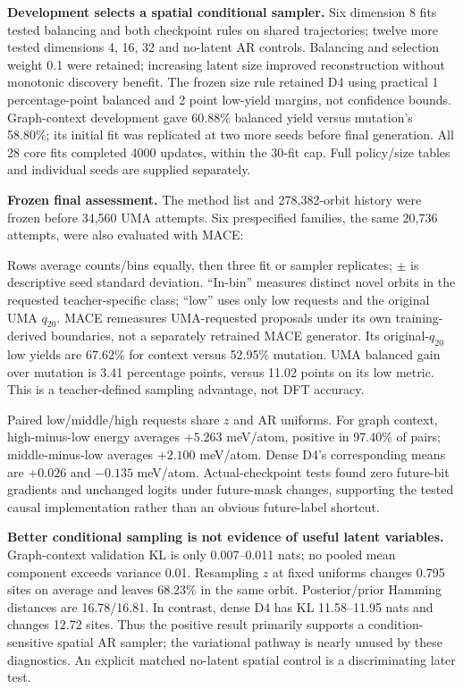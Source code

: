 \textbf{Development selects a spatial conditional sampler.}
Six dimension 8 fits tested balancing and both checkpoint rules on shared
trajectories; twelve more tested dimensions 4, 16, 32 and no-latent AR controls.
Balancing and selection weight 0.1 were retained; increasing latent size improved
reconstruction without monotonic discovery benefit. The frozen size rule retained
D4 using practical 1 percentage-point balanced and 2 point low-yield margins,
not confidence bounds. Graph-context development gave 60.88\% balanced yield
versus mutation's 58.80\%; its initial fit was replicated at two more seeds before
final generation. All 28 core fits completed 4000 updates, within the 30-fit cap.
Full policy/size tables and individual seeds are supplied separately.

\textbf{Frozen final assessment.} The method list and 278,382-orbit history were
frozen before 34,560 UMA attempts. Six prespecified families, the same 20,736
attempts, were also evaluated with MACE:



Rows average counts/bins equally, then three fit or sampler replicates;
$\pm$ is descriptive seed standard deviation. ``In-bin'' measures distinct novel
orbits in the requested teacher-specific class; ``low'' uses only low requests
and the original UMA $q_{20}$. MACE remeasures UMA-requested proposals under its own
training-derived boundaries, not a separately retrained MACE generator.
Its original-$q_{20}$ low yields are 67.62\% for context versus 52.95\% mutation.
UMA balanced gain over mutation is 3.41 percentage points, versus 11.02 points
on its low metric. This is a teacher-defined sampling advantage, not DFT accuracy.

Paired low/middle/high requests share $z$ and AR uniforms. For graph context,
high-minus-low energy averages $+5.263$ meV/atom, positive in 97.40\% of pairs;
middle-minus-low averages $+2.100$ meV/atom. Dense D4's corresponding means are
$+0.026$ and $-0.135$ meV/atom. Actual-checkpoint tests found zero future-bit
gradients and unchanged logits under future-mask changes, supporting the tested
causal implementation rather than an obvious future-label shortcut.

\textbf{Better conditional sampling is not evidence of useful latent variables.}
Graph-context validation KL is only 0.007--0.011 nats; no pooled mean component
exceeds variance 0.01. Resampling $z$ at fixed uniforms changes 0.795 sites on
average and leaves 68.23\% in the same orbit. Posterior/prior Hamming distances
are 16.78/16.81. In contrast, dense D4 has KL 11.58--11.95 nats and changes
12.72 sites. Thus the positive result primarily supports a condition-sensitive
spatial AR sampler; the variational pathway is nearly unused by these diagnostics.
An explicit matched no-latent spatial control is a discriminating later test.


